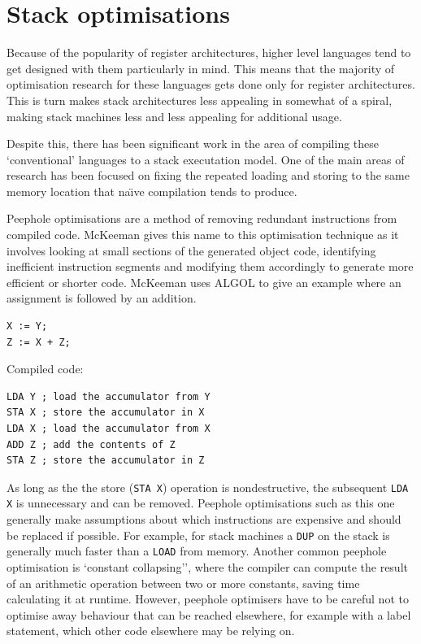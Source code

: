 \section{Stack optimisations}

Because of the popularity of register architectures, higher level languages tend
to get designed with them particularly in mind. This means that the majority of
optimisation research for these languages gets done only for register
architectures. This is turn makes stack architectures less appealing in somewhat
of a spiral, making stack machines less and less appealing for additional usage.

Despite this, there has been significant work in the area of compiling these
`conventional' languages to a stack executation model. One of the main areas of
research has been focused on fixing the repeated loading and storing to the same
memory location that na{\"\i}ve compilation tends to produce.

Peephole optimisations are a method of removing redundant instructions from
compiled code. McKeeman gives this name to this optimisation technique as it
involves looking at small sections of the generated object code, identifying
inefficient instruction segments and modifying them accordingly to generate
more efficient or shorter code. McKeeman uses ALGOL to give an example where an
assignment is followed by an addition.

\begin{minipage}{.25\textwidth}
  \centering
  \begin{lstlisting}[language=Algol]
X := Y;
Z := X + Z;
  \end{lstlisting}
\end{minipage}%
\begin{minipage}{.55\textwidth}
  Compiled code:
  \begin{lstlisting}
LDA Y ; load the accumulator from Y
STA X ; store the accumulator in X
LDA X ; load the accumulator from X
ADD Z ; add the contents of Z
STA Z ; store the accumulator in Z
  \end{lstlisting}
\end{minipage}

As long as the the store (\lstinline{STA X}) operation is nondestructive, the
subsequent \lstinline{LDA X} is unnecessary and can be removed. Peephole
optimisations such as this one generally make assumptions about which
instructions are expensive and should be replaced if possible. For example, for
stack machines a \lstinline{DUP} on the stack is generally much faster than a
\lstinline{LOAD} from memory. Another common peephole optimisation is `constant
collapsing'', where the compiler can compute the result of an arithmetic
operation between two or more constants, saving time calculating it at runtime.
However, peephole optimisers have to be careful not to optimise away behaviour
that can be reached elsewhere, for example with a label statement, which other
code elsewhere may be relying on.\cite{McKeeman1965Peephole}

